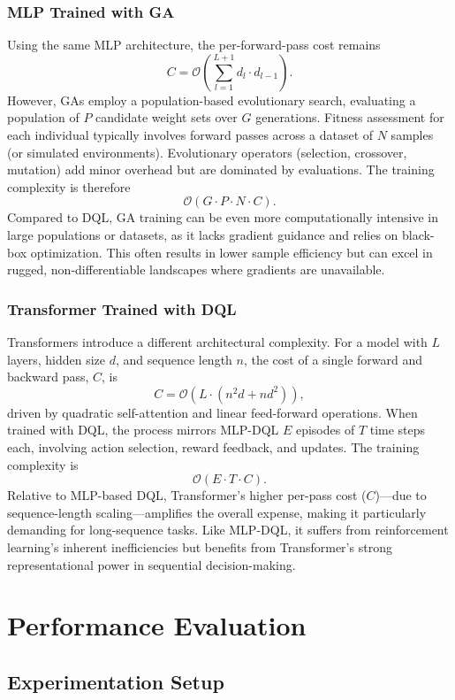 \documentclass[preprint,3p,authoryear]{elsarticle}
\begin{document}
\subsubsection{MLP Trained with GA}
Using the same MLP architecture, the per-forward-pass cost remains
\[
C = \mathcal{O}\!\left( \sum_{l=1}^{L+1} d_l \cdot d_{l-1} \right).
\]
However, GAs employ a population-based evolutionary search, evaluating a population of $P$ candidate weight sets over $G$ generations. Fitness assessment for each individual typically involves forward passes across a dataset of $N$ samples (or simulated environments). Evolutionary operators (selection, crossover, mutation) add minor overhead but are dominated by evaluations. The training complexity is therefore
\[
\mathcal{O}(G \cdot P \cdot N \cdot C).
\]
Compared to DQL, GA training can be even more computationally intensive in large populations or datasets, as it lacks gradient guidance and relies on black-box optimization. This often results in lower sample efficiency but can excel in rugged, non-differentiable landscapes where gradients are unavailable.

\subsubsection{Transformer Trained with DQL}
Transformers introduce a different architectural complexity. For a model with $L$ layers, hidden size $d$, and sequence length $n$, the cost of a single forward and backward pass, $C$, is
\[
C = \mathcal{O}\!\left( L \cdot (n^2 d + n d^2) \right),
\]
driven by quadratic self-attention and linear feed-forward operations. When trained with DQL, the process mirrors MLP-DQL\: $E$ episodes of $T$ time steps each, involving action selection, reward feedback, and updates. The training complexity is
\[
\mathcal{O}(E \cdot T \cdot C).
\]
Relative to MLP-based DQL, Transformer’s higher per-pass cost ($C$)—due to sequence-length scaling—amplifies the overall expense, making it particularly demanding for long-sequence tasks. Like MLP-DQL, it suffers from reinforcement learning's inherent inefficiencies but benefits from Transformer’s strong representational power in sequential decision-making.



\section{Performance Evaluation}\label{sec:performance_evaluation}

\subsection{Experimentation Setup}
\end{document}
